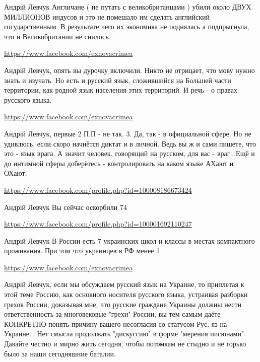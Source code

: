 \documentclass[a4paper,11pt]{extreport}
\begin{document}
\begin{itemize}
\begin{itemize}
Андрій Левчук Англичане ( не путать с великобританцами ) убили около ДВУХ МИЛЛИОНОВ индусов и это не помешало им сделать английский государственным. В результате чего их экономика не поднялась а подпрыгнула, что и Великобритании не снилось.

\url{https://www.facebook.com/exnovacrimea}

Андрій Левчук, опять вы дурочку включили. Никто не отрицает, что мову нужно знать и изучать. Но есть и русский язык, сложившийся на Большей части территории, как родной язык населения этих территорий. И речь - о правах русского языка.

\url{https://www.facebook.com/exnovacrimea}

Андрій Левчук, первые 2 П.П - не так. 3. Да, так - в официальной сфере. Но не удивлюсь, если скоро начнётся диктат и в личной. Ведь вы ж и сами пишете, что это - язык врага. А значит человек, говорящий на русском, для вас - враг...Ещё и до интимной сферы доберётесь - контролировать на каком языке АХают и ОХают.

\url{https://www.facebook.com/profile.php?id=100008186673424}

Андрій Левчук Вы сейчас оскорбили 74 %

\url{https://www.facebook.com/profile.php?id=100001692110247}

Андрій Левчук В России есть 7 украинских школ и классы в местах компактного проживания. При том что украинцев в РФ менее 1 %

\url{https://www.facebook.com/exnovacrimea}

Андрій Левчук, если мы обсуждаем русский язык на Украине, то приплетая к этой теме Россию, как основного носителя русского языка, устраивая разборки грехов России, доказывая мне, что русские граждане Украины должны нести ответственность за многовековые "грехи" России, вы тем самым даёте КОНКРЕТНО понять причину вашего несогласия со статусом Рус. яз на Украине....Нет смысла продолжать "дискуссию" в форме "мерения писюнами". Давайте честно и мирно жить сегодня, чтобы потомкам не стыдно и не горько было за наши сегодняшние баталии.


\end{itemize}
\end{itemize}
\end{document}
